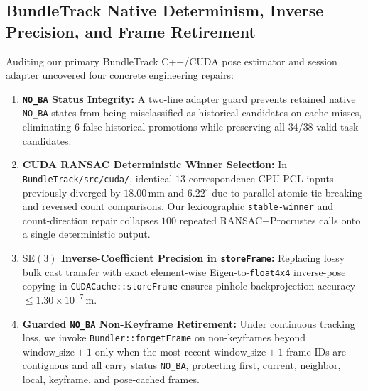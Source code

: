 \documentclass{evidencescene}
\begin{document}
\subsection{BundleTrack Native Determinism, Inverse Precision, and Frame Retirement}
\label{sec:native_bt}
Auditing our primary BundleTrack C++/CUDA pose estimator and session adapter uncovered four concrete engineering repairs:
\begin{enumerate}
    \item \textbf{\texttt{NO\_BA} Status Integrity:} A two-line adapter guard prevents retained native \texttt{NO\_BA} states from being misclassified as historical candidates on cache misses, eliminating $6$ false historical promotions while preserving all $34/38$ valid task candidates.
    \item \textbf{CUDA RANSAC Deterministic Winner Selection:} In \texttt{BundleTrack/src/cuda/}, identical $13$-correspondence CPU PCL inputs previously diverged by $18.00\,\mathrm{mm}$ and $6.22^\circ$ due to parallel atomic tie-breaking and reversed count comparisons. Our lexicographic \texttt{stable-winner} and count-direction repair collapses $100$ repeated RANSAC+Procrustes calls onto a single deterministic output.
    \item \textbf{$\mathrm{SE}(3)$ Inverse-Coefficient Precision in \texttt{storeFrame}:} Replacing lossy bulk cast transfer with exact element-wise Eigen-to-\texttt{float4x4} inverse-pose copying in \texttt{CUDACache::storeFrame} ensures pinhole backprojection accuracy $\le 1.30\times 10^{-7}\,\mathrm{m}$.
    \item \textbf{Guarded \texttt{NO\_BA} Non-Keyframe Retirement:} Under continuous tracking loss, we invoke \texttt{Bundler::forgetFrame} on non-keyframes beyond $\text{window\_size}+1$ only when the most recent $\text{window\_size}+1$ frame IDs are contiguous and all carry status \texttt{NO\_BA}, protecting first, current, neighbor, local, keyframe, and pose-cached frames.
\end{enumerate}
\end{document}
